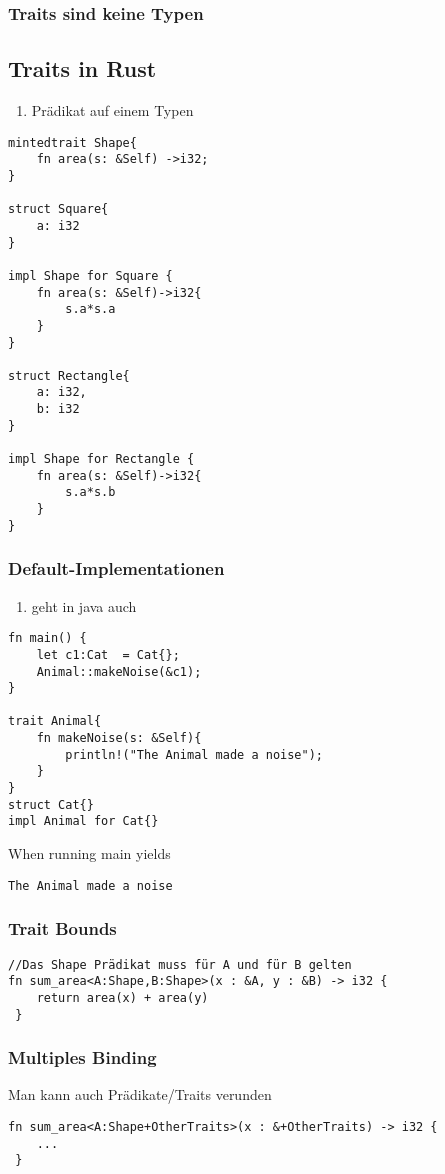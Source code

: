 \documentclass[a4paper, 1ppt]{article}
\begin{document}
\subsubsection{Traits sind keine Typen}
\subsection{Traits in Rust}
\begin{enumerate}
		\item Prädikat auf einem Typen
\end{enumerate}

\begin{verbatim}
mintedtrait Shape{
    fn area(s: &Self) ->i32;
}

struct Square{
    a: i32
}

impl Shape for Square {
    fn area(s: &Self)->i32{
        s.a*s.a
    }
}

struct Rectangle{
    a: i32,
    b: i32
}

impl Shape for Rectangle {
    fn area(s: &Self)->i32{
        s.a*s.b
    }
}

\end{verbatim}
\subsubsection{Default-Implementationen}
\begin{enumerate}
	\item geht in java auch
\end{enumerate}
\begin{verbatim}
fn main() {
    let c1:Cat  = Cat{};
    Animal::makeNoise(&c1);
}

trait Animal{
    fn makeNoise(s: &Self){
        println!("The Animal made a noise");
    }
}
struct Cat{}
impl Animal for Cat{}
\end{verbatim}
When running main yields
\begin{verbatim}
The Animal made a noise
\end{verbatim}
\subsubsection{Trait Bounds}
\begin{verbatim}
//Das Shape Prädikat muss für A und für B gelten
fn sum_area<A:Shape,B:Shape>(x : &A, y : &B) -> i32 {
    return area(x) + area(y)
 }
\end{verbatim}
\subsubsection{Multiples Binding}
Man kann auch Prädikate/Traits verunden
\begin{verbatim}
fn sum_area<A:Shape+OtherTraits>(x : &+OtherTraits) -> i32 {
	...
 }
\end{verbatim}
\end{document}
